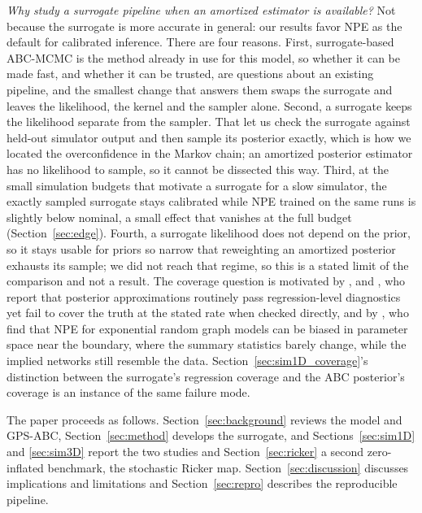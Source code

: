 \documentclass[sn-basic,iicol,pdflatex]{sn-jnl}
\begin{document}
\emph{Why study a surrogate pipeline when an amortized estimator is available?} Not because the surrogate is more accurate in general: our results favor NPE as the default for calibrated inference. There are four reasons. First, surrogate-based ABC-MCMC is the method already in use for this model, so whether it can be made fast, and whether it can be trusted, are questions about an existing pipeline, and the smallest change that answers them swaps the surrogate and leaves the likelihood, the kernel and the sampler alone. Second, a surrogate keeps the likelihood separate from the sampler. That let us check the surrogate against held-out simulator output and then sample its posterior exactly, which is how we located the overconfidence in the Markov chain; an amortized posterior estimator has no likelihood to sample, so it cannot be dissected this way. Third, at the small simulation budgets that motivate a surrogate for a slow simulator, the exactly sampled surrogate stays calibrated while NPE trained on the same runs is slightly below nominal, a small effect that vanishes at the full budget (Section~\ref{sec:edge}). Fourth, a surrogate likelihood does not depend on the prior, so it stays usable for priors so narrow that reweighting an amortized posterior exhausts its sample; we did not reach that regime, so this is a stated limit of the comparison and not a result. The coverage question is motivated by
\citet{talts2018}, \citet{lemos2023} and \citet{hermans2022}, who report that posterior
approximations routinely pass regression-level diagnostics yet fail to cover the
truth at the stated rate when checked directly, and by \citet{fanwhite2026},
who find that NPE for exponential random graph models can be biased in parameter space near the boundary, where the summary statistics barely change, while the implied networks still resemble the data. Section~\ref{sec:sim1D_coverage}'s distinction
between the surrogate's regression coverage and the ABC posterior's coverage is
an instance of the same failure mode.

The paper proceeds as follows. Section~\ref{sec:background} reviews the model
and GPS-ABC, Section~\ref{sec:method} develops the surrogate, and
Sections~\ref{sec:sim1D} and \ref{sec:sim3D} report the two studies and Section~\ref{sec:ricker} a second zero-inflated benchmark, the stochastic Ricker map.
Section~\ref{sec:discussion} discusses implications and limitations and
Section~\ref{sec:repro} describes the reproducible pipeline.

\end{document}
